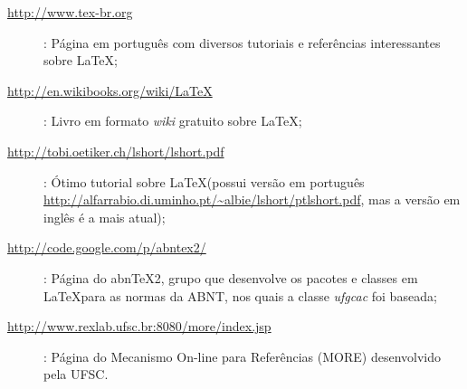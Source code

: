 \begin{description}
 \item[\url{http://www.tex-br.org}]: Página em português com diversos tutoriais e referências interessantes sobre \LaTeX;
 \item[\url{http://en.wikibooks.org/wiki/LaTeX}]: Livro em formato \textit{wiki} gratuito sobre \LaTeX;
 \item[\url{http://tobi.oetiker.ch/lshort/lshort.pdf}]: Ótimo tutorial sobre \LaTeX (possui versão em português \url{http://alfarrabio.di.uminho.pt/~albie/lshort/ptlshort.pdf}, mas a versão em inglês é a mais atual);
 \item[\url{http://code.google.com/p/abntex2/}]: Página do abnTeX2, grupo que desenvolve os pacotes e classes em \LaTeX para as normas da ABNT, nos quais a classe \textit{ufgcac} foi baseada;
\item[\url{ http://www.rexlab.ufsc.br:8080/more/index.jsp}]: Página do Mecanismo On-line para Referências  (MORE) desenvolvido pela UFSC.
 \end{description}